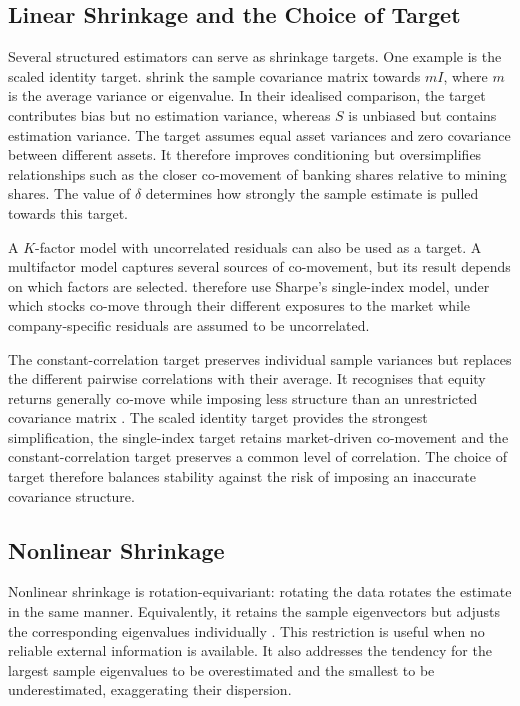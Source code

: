 \subsection{Linear Shrinkage and the Choice of Target}

Several structured estimators can serve as shrinkage targets. One example is the scaled identity target. \textcite[368--370]{ledoit2004well} shrink the sample covariance matrix towards \(mI\), where \(m\) is the average variance or eigenvalue. In their idealised comparison, the target contributes bias but no estimation variance, whereas \(S\) is unbiased but contains estimation variance. The target assumes equal asset variances and zero covariance between different assets. It therefore improves conditioning but oversimplifies relationships such as the closer co-movement of banking shares relative to mining shares. The value of \(\delta\) determines how strongly the sample estimate is pulled towards this target.

A \(K\)-factor model with uncorrelated residuals can also be used as a target. A multifactor model captures several sources of co-movement, but its result depends on which factors are selected. \textcite[607--608]{LEDOIT2003603} therefore use Sharpe's single-index model, under which stocks co-move through their different exposures to the market while company-specific residuals are assumed to be uncorrelated.

The constant-correlation target preserves individual sample variances but replaces the different pairwise correlations with their average. It recognises that equity returns generally co-move while imposing less structure than an unrestricted covariance matrix \parencite[113]{ledoit2004honey}. The scaled identity target provides the strongest simplification, the single-index target retains market-driven co-movement and the constant-correlation target preserves a common level of correlation. The choice of target therefore balances stability against the risk of imposing an inaccurate covariance structure.

\subsection{Nonlinear Shrinkage}

Nonlinear shrinkage is rotation-equivariant: rotating the data rotates the estimate in the same manner. Equivalently, it retains the sample eigenvectors but adjusts the corresponding eigenvalues individually \parencite[1025]{ledoit2012nonlinear}. This restriction is useful when no reliable external information is available. It also addresses the tendency for the largest sample eigenvalues to be overestimated and the smallest to be underestimated, exaggerating their dispersion.

